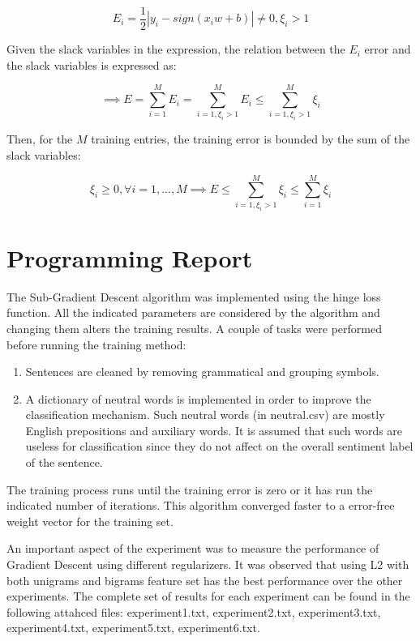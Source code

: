 \documentclass[11pt]{article}
\begin{document}
$$E_i=\frac{1}{2}|y_i-sign(x_iw+b)| \neq 0, \xi_i > 1$$

Given the slack variables in the expression, the relation between the $E_i$ error and the slack variables is expressed as:

$$\implies E = \sum_{i=1}^{M} E_i = \sum_{i=1, \xi_i>1}^{M} E_i \leq \sum_{i=1, \xi_i>1}^{M} \xi_i$$

Then, for the $M$ training entries, the training error is bounded by the sum of the slack variables:

$$\xi_i \geq 0, \forall i=1,...,M \implies E \leq \sum_{i=1, \xi_i>1}^{M} \xi_i \leq \sum_{i=1}^{M} \xi_i$$


\section{Programming Report}

The Sub-Gradient Descent algorithm was implemented using the hinge loss function. All the indicated parameters are considered by the algorithm and changing them alters the training results. A couple of tasks were performed before running the training method:

\begin{enumerate}
\item Sentences are cleaned by removing grammatical and grouping symbols.
\item A dictionary of neutral words is implemented in order to improve the classification mechanism. Such neutral words (in neutral.csv) are mostly English prepositions and auxiliary words. It is assumed that such words are useless for classification since they do not affect on the overall sentiment label of the sentence.
\end{enumerate}

The training process runs until the training error is zero or it has run the indicated number of iterations. This algorithm converged faster to a error-free weight vector for the training set. 

An important aspect of the experiment was to measure the performance of Gradient Descent using different regularizers. It was observed that using L2 with both unigrams and bigrams feature set has the best performance over the other experiments. The complete set of results for each experiment can be found in the following attahced files: experiment1.txt, experiment2.txt, experiment3.txt, experiment4.txt, experiment5.txt, experiment6.txt.
\end{document}
